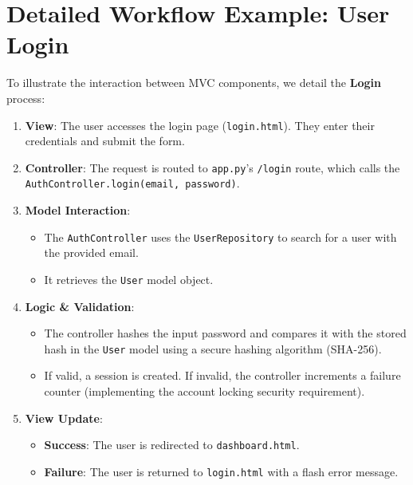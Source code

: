 \documentclass[12pt,a4paper]{article}
\begin{document}

\section{Detailed Workflow Example: User Login}

To illustrate the interaction between MVC components, we detail the \textbf{Login} process:

\begin{enumerate}
    \item \textbf{View}: The user accesses the login page (\texttt{login.html}). They enter their credentials and submit the form.
    \item \textbf{Controller}: The request is routed to \texttt{app.py}'s \texttt{/login} route, which calls the \texttt{AuthController.login(email, password)}.
    \item \textbf{Model Interaction}: 
    \begin{itemize}
        \item The \texttt{AuthController} uses the \texttt{UserRepository} to search for a user with the provided email.
        \item It retrieves the \texttt{User} model object.
    \end{itemize}
    \item \textbf{Logic \& Validation}:
    \begin{itemize}
        \item The controller hashes the input password and compares it with the stored hash in the \texttt{User} model using a secure hashing algorithm (SHA-256).
        \item If valid, a session is created. If invalid, the controller increments a failure counter (implementing the account locking security requirement).
    \end{itemize}
    \item \textbf{View Update}:
    \begin{itemize}
        \item \textbf{Success}: The user is redirected to \texttt{dashboard.html}.
        \item \textbf{Failure}: The user is returned to \texttt{login.html} with a flash error message.
    \end{itemize}
\end{enumerate}
\end{document}

